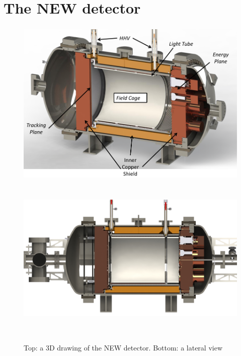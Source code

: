 \section{The NEW detector}
\label{sec.new}




\begin{figure}[hpt!]
\centering
\includegraphics[height=8cm]{img/NEWMay20163D.png}
\includegraphics[height=8cm]{img/NEWMay2016.png}
\caption{Top: a 3D drawing of the NEW detector. Bottom: a lateral view} \label{fig:NewOverview}
\end{figure}

